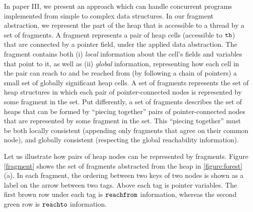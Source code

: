 
In paper III, we present an approach which can handle concurrent programs implemented from simple to complex data structures.  In our fragment abstraction,
 we represent the part of the heap that is accessible to a thread by a set of fragments. A fragment represents a pair of heap cells (accessible to ${\tt th}$)
that are connected by a pointer field, under the applied data abstraction. The fragment contains both
(i) {\em local} information about the cell's fields and variables that
  point to it, as well as
(ii) {\em global} information, representing how
  each cell in the pair can reach to and be reached from
  (by following a chain of pointers) a small set of globally significant
  heap cells.
 A set of fragments represents the set of heap
structures in which each pair of pointer-connected nodes is represented by some
fragment in the set.
Put differently, a set of fragments describes the set of heaps that can be formed by
``piecing together'' pairs of pointer-connected nodes that are represented
by some fragment in the set. This ``piecing together'' must
be both locally consistent (appending only fragments that agree on their
common node), and globally consistent (respecting the global reachability
information).


Let us illustrate how pairs of heap nodes can be represented by fragments. Figure \ref{fragment} shows the set of fragments abstracted from the heap in \ref{figure:forest}(a). In each fragment, the ordering between two keys of two nodes is shown as a label on the arrow between two tags. Above each tag is pointer variables. The first brown row under each tag is $\tt reachfrom$ information, whereas the second green row is $\tt reachto$ information.





